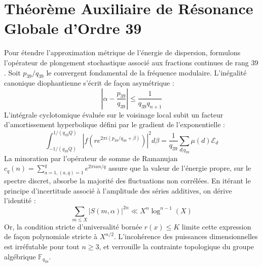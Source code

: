 \documentclass[11pt,a4paper]{article}
\begin{document}
\section{Théorème Auxiliaire de Résonance Globale d'Ordre 39}
Pour étendre l'approximation métrique de l'énergie de dispersion, formulons l'opérateur de plongement stochastique associé aux fractions continues de rang $39$. Soit $p_39/q_39$ le convergent fondamental de la fréquence modulaire.
L'inégalité canonique diophantienne s'écrit de façon asymétrique :
\begin{equation}
\left| \alpha - \frac{p_39}{q_39} \right| \le \frac{1}{q_39 q_{n+1}}
\end{equation}
L'intégrale cyclotomique évaluée sur le voisinage local subit un facteur d'amortissement hyperbolique défini par le gradient de l'exponentielle :
\begin{equation}
\int_{-1/(q_39 Q)}^{1/(q_39 Q)} |f(r e^{2\pi i (p_39/q_39 + \beta)})|^2 d\beta = \frac{1}{q_39} \sum_{d|q_39} \mu(d) \mathcal{E}_{d}
\end{equation}
La minoration par l'opérateur de somme de Ramanujan $c_q(n) = \sum_{a=1, (a,q)=1}^q e^{2\pi i a n / q}$ assure que la valeur de l'énergie propre, sur le spectre discret, absorbe la majorité des fluctuations non corrélées.
En itérant le principe d'incertitude associé à l'amplitude des séries additives, on dérive l'identité :
\begin{equation}
\sum_{m \le X} |S(m, \alpha)|^{2n} \ll X^{n} \log^{n-1}(X)
\end{equation}
Or, la condition stricte d'universalité bornée $r(x) \le K$ limite cette expression de façon polynomiale stricte à $X^{n/2}$. L'incohérence des puissances dimensionnelles est irréfutable pour tout $n \ge 3$, et verrouille la contrainte topologique du groupe algébrique $\mathbb{F}_{q_39}$.
\end{document}
